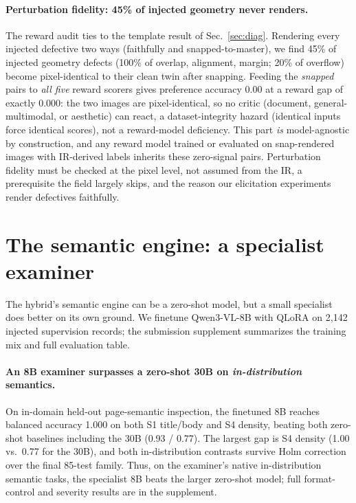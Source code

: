 \documentclass[10pt]{article}
\newcommand{\g}[1]{\textsf{#1}}        %
\begin{document}
\paragraph{Perturbation fidelity: 45\% of injected geometry never renders.}
The reward audit ties to the template result of Sec.~\ref{sec:diag}. Rendering every injected defective two
ways (faithfully and snapped-to-master), we find 45\% of injected geometry defects (100\% of overlap,
alignment, margin; 20\% of overflow) become pixel-identical to their clean twin after snapping. Feeding the
\emph{snapped} pairs to \emph{all five} reward scorers gives preference accuracy 0.00 at a reward gap of exactly
0.000: the two images are pixel-identical, so no critic (document, general-multimodal, or aesthetic) can react, a
dataset-integrity hazard (identical inputs force identical scores), not a reward-model deficiency.
This part \emph{is} model-agnostic by construction, and any reward model trained or evaluated on snap-rendered
images with IR-derived labels inherits these zero-signal pairs. Perturbation fidelity must be checked at the pixel
level, not assumed from the IR, a prerequisite the field largely skips, and the reason our elicitation
experiments render defectives faithfully.

\section{The semantic engine: a specialist examiner}\label{sec:examiner}

The hybrid's semantic engine can be a zero-shot model, but a small specialist does better on its own ground. We
finetune Qwen3-VL-8B with QLoRA on 2{,}142 injected supervision records; the submission supplement summarizes
the training mix and full evaluation table.

\paragraph{An 8B examiner surpasses a zero-shot 30B on \emph{in-distribution} semantics.}
On in-domain held-out page-semantic inspection, the finetuned 8B reaches balanced accuracy 1.000 on both
\g{S1} title/body and \g{S4} density, beating both zero-shot baselines including the 30B (0.93 / 0.77).
The largest gap is \g{S4} density (1.00 vs.\ 0.77 for the 30B), and both in-distribution contrasts survive
Holm correction over the final 85-test family. Thus, on the examiner's native in-distribution semantic tasks, the
specialist 8B beats the larger zero-shot model; full format-control and severity results are in the supplement.
\end{document}

